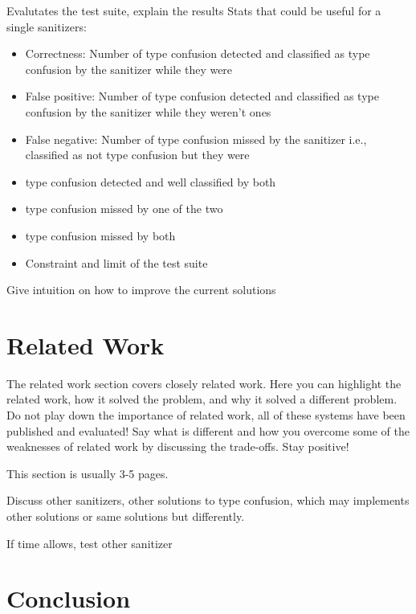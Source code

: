 \documentclass[a4paper,11pt,oneside]{report}
\begin{document}
Evalutates the test suite, explain the results
Stats that could be useful for a single sanitizers:
\begin{itemize}
       \item Correctness: Number of type confusion detected and classified as type confusion by the sanitizer while they were
       \item False positive: Number of type confusion detected and classified as type confusion by the sanitizer while they weren't ones
       \item False negative: Number of type confusion missed by the sanitizer i.e., classified as not type confusion but they were

       \item type confusion detected and well classified by both
       \item type confusion missed by one of the two
       \item type confusion missed by both

       \item Constraint and limit of the test suite

\end{itemize}

Give intuition on how to improve the current solutions

\chapter{Related Work}

The related work section covers closely related work. Here you can highlight
the related work, how it solved the problem, and why it solved a different
problem. Do not play down the importance of related work, all of these
systems have been published and evaluated! Say what is different and how
you overcome some of the weaknesses of related work by discussing the 
trade-offs. Stay positive!

This section is usually 3-5 pages.

Discuss other sanitizers, other solutions to type confusion,
which may implements other solutions or same solutions but differently.

If time allows, test other sanitizer




\chapter{Conclusion}
\end{document}
